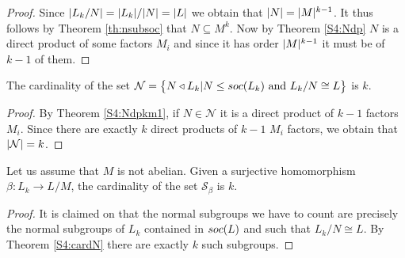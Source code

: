 \begin{proof}
    Since $| L_k/N | = | L_k | / | N | = | L |$ we obtain that $| N | = | M |^{k-1}$. It thus follows by Theorem \ref{th:nsubsoc} that $N \subseteq M^k$. Now by Theorem \ref{S4:Ndp} $N$ is a direct product of some factors $M_i$ and since it has order $| M |^{k-1}$ it must be of $k-1$ of them. 
\end{proof}

\begin{theorem}
    \label{S4:cardN}
    The cardinality of the set $\mathcal{N} = \left\{N \triangleleft L_k | N \le soc {(L_k)} \text{ and } L_k /N \cong L \right\}$ is $k$.
\end{theorem}

\begin{proof}
    By Theorem \ref{S4:Ndpkm1}, if $N \in \mathcal{N}$ it is a direct product of $k-1$ factors $M_i$. Since there are exactly $k$ direct products of $k-1$ $M_i$ factors, we obtain that $| \mathcal{N} | = k$.
\end{proof}

\begin{theorem}
    \label{cardS}
    Let us assume that $M$ is not abelian. Given a surjective homomorphism $\beta \colon L_k \rightarrow L/M$, the cardinality of the set $\mathscr{S}_\beta$ is $k$.
\end{theorem}

\begin{proof}
    It is claimed on \cite[Lemma 2.5]{DallaVoltaFGNMGAPQ} that the normal subgroups we have to count are precisely the normal subgroups of $L_k$ contained in $soc {(L)}$ and such that $L_k/N \cong L$. By Theorem \ref{S4:cardN} there are exactly $k$ such subgroups.
    
    
\end{proof}